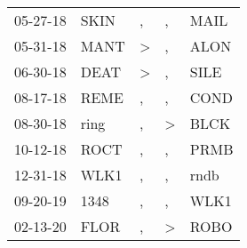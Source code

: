 \begin{supertabular}{lllll}
 05-27-18 &  SKIN &             , &             , &  MAIL \\
 05-31-18 &  MANT &  \textgreater &             , &  ALON \\
 06-30-18 &  DEAT &  \textgreater &             , &  SILE \\
 08-17-18 &  REME &             , &             , &  COND \\
 08-30-18 &  ring &             , &  \textgreater &  BLCK \\
 10-12-18 &  ROCT &             , &             , &  PRMB \\
 12-31-18 &  WLK1 &             , &             , &  rndb \\
 09-20-19 &  1348 &             , &             , &  WLK1 \\
 02-13-20 &  FLOR &             , &  \textgreater &  ROBO \\
\end{supertabular}
